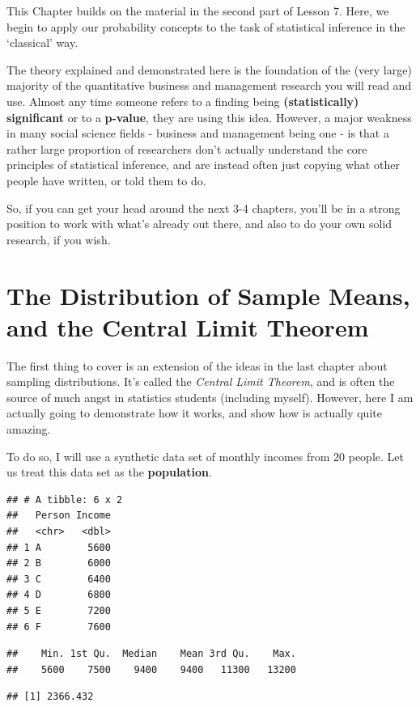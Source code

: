 \documentclass[
]{book}
\begin{document}
This Chapter builds on the material in the second part of Lesson 7. Here, we begin to apply our probability concepts to the task of statistical inference in the `classical' way.

The theory explained and demonstrated here is the foundation of the (very large) majority of the quantitative business and management research you will read and use. Almost any time someone refers to a finding being \textbf{(statistically) significant} or to a \textbf{p-value}, they are using this idea. However, a major weakness in many social science fields - business and management being one - is that a rather large proportion of researchers don't actually understand the core principles of statistical inference, and are instead often just copying what other people have written, or told them to do.

So, if you can get your head around the next 3-4 chapters, you'll be in a strong position to work with what's already out there, and also to do your own solid research, if you wish.

\section{The Distribution of Sample Means, and the Central Limit Theorem}\label{the-distribution-of-sample-means-and-the-central-limit-theorem}

The first thing to cover is an extension of the ideas in the last chapter about sampling distributions. It's called the \emph{Central Limit Theorem}, and is often the source of much angst in statistics students (including myself). However, here I am actually going to demonstrate how it works, and show how is actually quite amazing.

To do so, I will use a synthetic data set of monthly incomes from 20 people. Let us treat this data set as the \textbf{population}.

\begin{verbatim}
## # A tibble: 6 x 2
##   Person Income
##   <chr>   <dbl>
## 1 A        5600
## 2 B        6000
## 3 C        6400
## 4 D        6800
## 5 E        7200
## 6 F        7600
\end{verbatim}

\begin{verbatim}
##    Min. 1st Qu.  Median    Mean 3rd Qu.    Max. 
##    5600    7500    9400    9400   11300   13200
\end{verbatim}

\begin{verbatim}
## [1] 2366.432
\end{verbatim}
\end{document}
